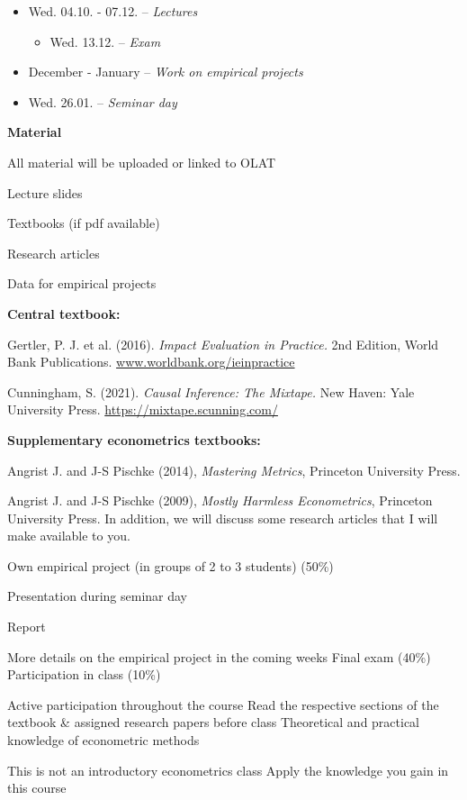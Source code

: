 \documentclass[
  25pt,         %
  a4paper,
  landscape,
  Screen4to3,
  footrule ]{foils}
\newcommand{\xx}{\item[{\small $\bullet$}]}
\begin{document}
	\begin{itemize}
		\vsm\item Wed. 04.10. - 07.12. -- \textit{Lectures}
    \begin{itemize}
	          \item Wed. 13.12. -- \textit{Exam}
    \end{itemize}
    \vsm\item December - January -- \textit{Work on empirical projects}    
		\vsm\item Wed. 26.01. -- \textit{Seminar day}
	\end{itemize}




\textbf{Material}

\bi

  \x All material will be uploaded or linked to OLAT
  \bi
    \xx Lecture slides
    \xx Textbooks (if pdf available)
    \xx Research articles
    \xx Data for empirical projects
  \ei
\ei




\begin{small}

\bi
\x \textbf{Central textbook:} \vsm
\bi
\xx Gertler, P. J. et al. (2016). \emph{Impact Evaluation in Practice.} 2nd Edition, World Bank Publications. \url{www.worldbank.org/ieinpractice}
\medskip
\xx Cunningham, S. (2021). \emph{Causal Inference: The Mixtape.} New Haven: Yale University Press. \url{https://mixtape.scunning.com/}

\ei


 \x \textbf{Supplementary econometrics textbooks:} \vsm
\bi
 \xx Angrist J. and J-S Pischke (2014), \emph{Mastering Metrics\/}, Princeton University Press.
 \xx Angrist J. and J-S Pischke (2009), \emph{Mostly Harmless Econometrics\/}, Princeton University Press.
\ei
 \x In addition, we will discuss some research articles that I will make available to you.
\ei
\end{small}

\bi 
\x Own empirical project (in groups of 2 to 3 students) (50\%)
\bi
  \xx Presentation during seminar day
  \xx Report
  \xx More details on the empirical project in the coming weeks
\ei
\x Final exam (40\%)
\x Participation in class (10\%)
\ei

\bi
\x Active participation throughout the course
\x Read the respective sections of the textbook \& assigned research papers before class
\x Theoretical and practical knowledge of econometric methods
\bi
\xx This is not an introductory econometrics class
\ei
\x Apply the knowledge you gain in this course
\ei

\end{document}
